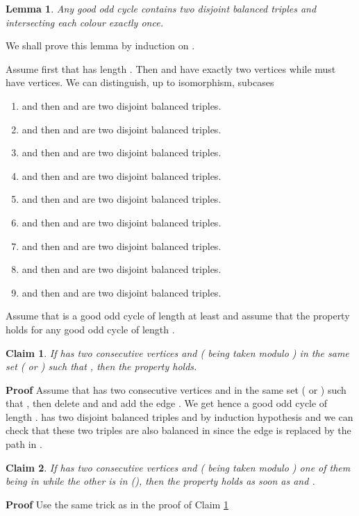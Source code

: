 \documentclass{elsart}
\theoremstyle{plain} \theoremheaderfont{\scshape}
\newtheorem{Lem}[Thm]{\bf Lemma}
\newtheorem{Clm}{Claim}[Thm]
\newenvironment{Prf}{{\bf \noindent Proof } }{\hfill\\}
\newenvironment{PrfClaim}{{\bf Proof }}{{\hfill\tiny{\\}}}
\begin{document}
\begin{Lem}\label{Lemma:DisjointBalancedTriples}  Any good odd cycle 
contains two disjoint balanced triples  and  intersecting
each colour exactly once.
\end{Lem}
\begin{Prf} We
shall prove this lemma by induction on .

Assume first that  has length . Then  and  have
exactly two vertices while  must have  vertices. We can
distinguish, up to isomorphism,  subcases

\begin{enumerate}
  \item   and
   then  and  are  two
  disjoint balanced triples.
  \item   and
   then  and  are  two
  disjoint balanced triples.
  \item  and
   then  and  are  two
  disjoint balanced triples.
  \item  and
   then  and  are  two
  disjoint balanced triples.
  \item  and
   then  and  are  two
  disjoint balanced triples.
  \item  and
   then  and  are  two
  disjoint balanced triples.
  \item  and
   then  and  are  two
  disjoint balanced triples.
  \item  and
   then  and  are  two
  disjoint balanced triples.
  \item  and
   then  and  are  two
  disjoint balanced triples.
\end{enumerate}

Assume that  is a good odd cycle of length at least  and
assume that the property holds for any good odd cycle of length
.

\begin{Clm} \label{Claim:Claim1DisjointBalancedTriples}
If  has  two consecutive vertices  and  ( being
taken modulo ) in the same set  ( or ) such that
, then the property holds.
\end{Clm}
\begin{PrfClaim} Assume that  has two consecutive
vertices  and   in the same set  ( or )
such that , then delete  and  and add
the edge . We get hence a good odd cycle  of
length .  has two disjoint balanced triples  and 
by induction hypothesis and we can check that these two triples are
also balanced in  since the edge  is replaced by
the path  in .
\end{PrfClaim}

\begin{Clm} \label{Claim:Claim2DisjointBalancedTriples}
If  has  two consecutive vertices  and  ( being
taken modulo ) one of them being in  while the other is in
 (), then the property holds as
soon as  and .
\end{Clm}
\begin{PrfClaim} Use the same trick as in the proof of Claim
\ref{Claim:Claim1DisjointBalancedTriples}
\end{PrfClaim}


\end{Prf}
\end{document}

